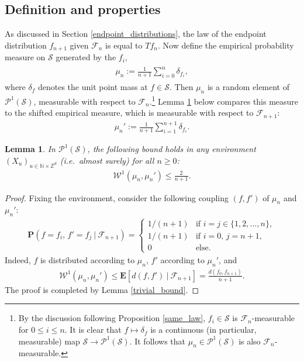\documentclass[11pt,reqno]{amsart}
\numberwithin{equation}{section}
\newtheorem{lemma}[thm]{Lemma}
\theoremstyle{definition}
\begin{document}
\subsection{Definition and properties} \label{empirical_measures}
As discussed in Section \ref{endpoint_distributions}, the law of the endpoint distribution $f_{n+1}$ given ${\mathcal{F}}_n$ is equal to $Tf_n$.
Now define the empirical probability measure on ${\mathcal{S}}$ generated by the $f_i$,
{\begin{align} \begin{split} {
\mu_n := \frac{1}{n+1} \sum_{i = 0}^n \delta_{f_i}, \label{mu_n_def}
} \end{split} \end{align}}
where $\delta_f$ denotes the unit point mass at $f \in {\mathcal{S}}$.
Then $\mu_n$ is a random element of ${\mathcal{P}}^1({\mathcal{S}})$, measurable with respect to ${\mathcal{F}}_n$.\footnote{By the discussion following Proposition \ref{same_law}, $f_i \in {\mathcal{S}}$ is ${\mathcal{F}}_n$-measurable for $0 \leq i \leq n$.
It is clear that $f \mapsto \delta_f$ is a continuous (in particular, measurable) map ${\mathcal{S}} \to {\mathcal{P}}^1({\mathcal{S}})$.
It follows that $\mu_n \in {\mathcal{P}}^1({\mathcal{S}})$ is also ${\mathcal{F}}_n$-measurable.}
Lemma \ref{regT} below compares this measure to the shifted empirical measure,
which is measurable with respect to ${\mathcal{F}}_{n+1}$:
{\begin{align*} {
\mu_n' := \frac{1}{n+1}\sum_{i = 1}^{n+1} \delta_{f_i}.
} \end{align*}}

\begin{lemma} \label{regT}
In $\mathcal{P}^1({\mathcal{S}})$, the following bound holds in any environment $(X_u)_{u \in {\mathbb{N}} \times {\mathbb{Z}}^d}$ (i.e.~almost surely) for all $n \geq 0$:
{\begin{align*} {
\mathcal{W}^1(\mu_n,\mu_n') \leq \frac{2}{n+1}.
} \end{align*}}
\end{lemma}

\begin{proof}
Fixing the environment, consider the following coupling $(f,f')$ of $\mu_n$ and $\mu_{n}'$:
{\begin{align*} {
{\mathbf{P}}{( {f = f_i,\, f' = f_j} \: | \: {{\mathcal{F}}_{n+1}} )} = \begin{cases}
1/(n+1) &\text{if } i = j \in \{1,2,\dots,n\}, \\
1/(n+1) &\text{if } i = 0,\, j = n+1, \\
0 &\text{else.}
\end{cases}
} \end{align*}}
Indeed, $f$ is distributed according to $\mu_n$, $f'$ according to $\mu_n'$, and
{\begin{align*} {
\mathcal{W}^1(\mu_n,\mu_n') \leq {\mathbf{E}}{[ {d(f,f')} \: | \: {{\mathcal{F}}_{n+1}} ]} = \frac{d(f_0,f_{n+1})}{n+1}.
} \end{align*}}
The proof is completed by Lemma \ref{trivial_bound}.
\end{proof}
\end{document}
